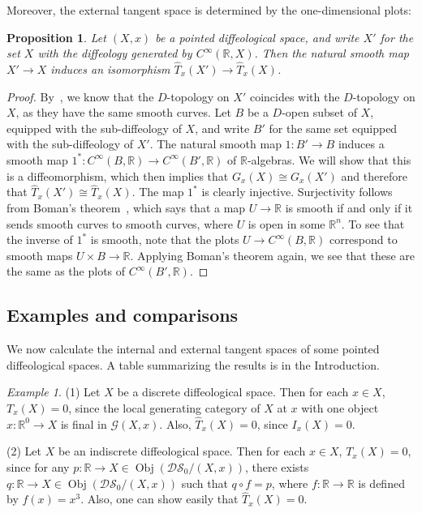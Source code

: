 \documentclass[12pt]{amsart}
\newtheorem{prop}[de]{Proposition}
\theoremstyle{remark}
\newtheorem{ex}[de]{Example}
\newcommand{\ra}{\to}
\DeclareMathOperator{\obj}{Obj}
\newcommand{\DS}{{\mathcal{DS}}}
\newcommand{\cG}{{\mathcal{G}}}
\def \R{\mathbb{R}}
\begin{document}
Moreover, the external tangent space is determined by the one-dimensional plots:

\begin{prop}\label{prop:1-plots-determine-external}
Let $(X,x)$ be a pointed diffeological space,
and write $X'$ for the set $X$ with the diffeology generated by $C^\infty(\R,X)$.
Then the natural smooth map $X' \ra X$ induces an isomorphism $\hat{T}_x(X') \ra \hat{T}_x(X)$.
\end{prop}

\begin{proof}
By~\cite[Theorem~3.7]{CSW}, we know that the $D$-topology on $X'$ coincides with the $D$-topology
on $X$, as they have the same smooth curves. Let $B$ be a $D$-open subset of $X$, equipped 
with the sub-diffeology of $X$, and write $B'$ for the same set equipped with the sub-diffeology 
of $X'$.
The natural smooth map $1:B' \ra B$ induces a smooth map 
$1^*: C^\infty(B,\R) \ra C^\infty(B',\R)$ of $\R$-algebras.
We will show that this is a diffeomorphism, which then implies that $G_x(X) \cong G_x(X')$
and therefore that $\hat{T}_x(X') \cong \hat{T}_x(X)$.
The map $1^*$ is clearly injective.
Surjectivity follows from Boman's theorem~\cite[Corollary~3.14]{KM},
which says that a map $U \to \R$ is smooth if and only if it sends smooth curves to smooth curves,
where $U$ is open in some $\R^n$.
To see that the inverse of $1^*$ is smooth, note that the plots
$U \to C^{\infty}(B, \R)$ correspond to smooth maps $U \times B \to \R$.
Applying Boman's theorem again, we see that these are the same as the
plots of $C^{\infty}(B', \R)$.
\end{proof}


%
%
%
%
%
%
%
%
%
%
%
%
%
%
%
%
%
%
%
%
%
%
%
%
%




%
%
%
%
%
%
%
%
%
%
%
%
%
%
%
%
%
%
%
%
%
%
%
%


\subsection{Examples and comparisons}\label{ss:examples}

We now calculate the internal and external tangent spaces of
some pointed diffeological spaces.
A table summarizing the results is in the Introduction.

\begin{ex}\label{(in)dis}
(1) Let $X$ be a discrete diffeological space.
Then for each $x \in X$,
$T_x(X)=0$, since the local generating category of $X$ at $x$
with one object $x:\R^0 \ra X$ is final in $\cG(X,x)$.
Also, $\hat{T}_x(X)=0$, since $I_x(X)=0$.

(2) Let $X$ be an indiscrete diffeological space.
Then for each $x \in X$, $T_x(X)=0$, since for any $p:\R \ra X \in \obj(\DS_0/(X,x))$,
there exists $q:\R \ra X \in \obj(\DS_0/(X,x))$ such that $q \circ f=p$,
where $f:\R \ra \R$ is defined by $f(x)=x^3$.
Also, one can show easily that $\hat{T}_x(X)=0$.
\end{ex}
\end{document}
